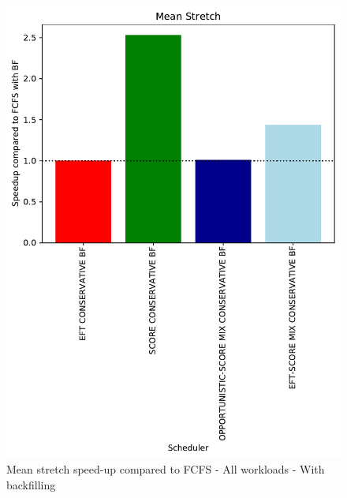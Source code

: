 \documentclass[conference,10pt]{IEEEtran}
\begin{document}
\begin{figure}\centering\includegraphics[width=1\linewidth]{../MBSS/plot/Results_Percentage_FCFS_BF_All_workloads_mean_Mean_Stretch_450_128_32_256_4_1024.pdf}\caption{Mean stretch speed-up compared to FCFS - All workloads - With backfilling}\end{figure}
\end{document}
